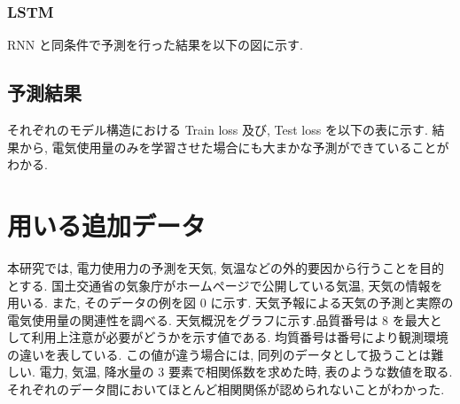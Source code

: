 \subsubsection{LSTM}
RNN と同条件で予測を行った結果を以下の図に示す.



\subsection{予測結果}
それぞれのモデル構造における Train loss 及び, Test loss を以下の表に示す.
結果から, 電気使用量のみを学習させた場合にも大まかな予測ができていることがわかる.


\section{用いる追加データ}
本研究では, 電力使用力の予測を天気, 気温などの外的要因から行うことを目的とする.
国土交通省の気象庁がホームページで公開している気温, 天気の情報を用いる.
また, そのデータの例を図 0 に示す. 天気予報による天気の予測と実際の電気使用量の関連性を調べる. 天気概況をグラフに示す.品質番号は 8 を最大として利用上注意が必要がどうかを示す値である. 均質番号は番号により観測環境の違いを表している. この値が違う場合には, 同列のデータとして扱うことは難しい.
電力, 気温, 降水量の 3 要素で相関係数を求めた時, 表のような数値を取る.
それぞれのデータ間においてほとんど相関関係が認められないことがわかった.

